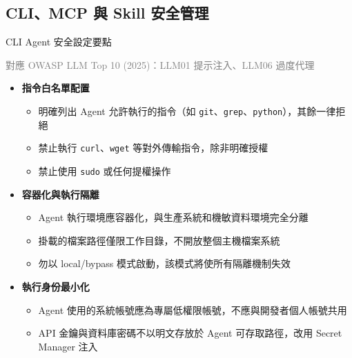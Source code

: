 \documentclass[aspectratio=1610]{Common/MyCourseBeamer}
\begin{document}
\subsection{CLI、MCP 與 Skill 安全管理}

\begin{frame}{CLI Agent 安全設定要點}

	{\scriptsize\textcolor{gray}{對應 OWASP LLM Top 10 (2025)：LLM01 提示注入、LLM06 過度代理}}\vspace{0.3em}

	\begin{itemize}
		\item \textbf{指令白名單配置}
			\begin{itemize}
				\item 明確列出 Agent 允許執行的指令（如 \texttt{git}、\texttt{grep}、\texttt{python}），其餘一律拒絕
				\item 禁止執行 \texttt{curl}、\texttt{wget} 等對外傳輸指令，除非明確授權
				\item 禁止使用 \texttt{sudo} 或任何提權操作
			\end{itemize}

		\item \textbf{容器化與執行隔離}
			\begin{itemize}
				\item Agent 執行環境應容器化，與生產系統和機敏資料環境完全分離
				\item 掛載的檔案路徑僅限工作目錄，不開放整個主機檔案系統
				\item \alert{勿以 local/bypass 模式啟動}，該模式將使所有隔離機制失效
			\end{itemize}

		\item \textbf{執行身份最小化}
			\begin{itemize}
				\item Agent 使用的系統帳號應為專屬低權限帳號，不應與開發者個人帳號共用
				\item API 金鑰與資料庫密碼不以明文存放於 Agent 可存取路徑，改用 Secret Manager 注入
			\end{itemize}
	\end{itemize}

\end{frame}
\end{document}
